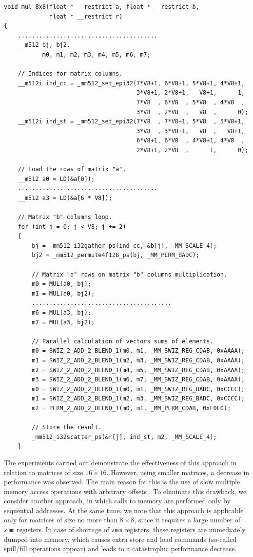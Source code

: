\documentclass[
11pt,%
tightenlines,%
twoside,%
onecolumn,%
nofloats,%
nobibnotes,%
nofootinbib,%
superscriptaddress,%
noshowpacs,%
centertags]%
{revtex4}
\begin{document}
\begin{lstlisting}[caption={Direct approach to \texttt{mul\_8x8} implementation.},label={lst:mul1}]
void mul_8x8(float * __restrict a, float * __restrict b,
             float * __restrict r)
{
    ........................................
    __m512 bj, bj2,
           m0, m1, m2, m3, m4, m5, m6, m7;

    // Indices for matrix columns.
    __m512i ind_cc = _mm512_set_epi32(7*V8+1, 6*V8+1, 5*V8+1, 4*V8+1,
                                      3*V8+1, 2*V8+1,   V8+1,      1,
                                      7*V8  , 6*V8  , 5*V8  , 4*V8  ,
                                      3*V8  , 2*V8  ,   V8  ,      0);
    __m512i ind_st = _mm512_set_epi32(7*V8  , 7*V8+1, 5*V8  , 5*V8+1,
                                      3*V8  , 3*V8+1,   V8  ,   V8+1,
                                      6*V8+1, 6*V8  , 4*V8+1, 4*V8  ,
                                      2*V8+1, 2*V8  ,      1,      0);

    // Load the rows of matrix "a".
    __m512 a0 = LD(&a[0]);
    ........................................
    __m512 a3 = LD(&a[6 * V8]);

    // Matrix "b" columns loop.
    for (int j = 0; j < V8; j += 2)
    {
        bj = _mm512_i32gather_ps(ind_cc, &b[j], _MM_SCALE_4);
        bj2 = _mm512_permute4f128_ps(bj, _MM_PERM_BADC);

        // Matrix "a" rows on matrix "b" columns multiplication.
        m0 = MUL(a0, bj);
        m1 = MUL(a0, bj2);
        ........................................
        m6 = MUL(a3, bj);
        m7 = MUL(a3, bj2);

        // Parallel calculation of vectors sums of elements.
        m0 = SWIZ_2_ADD_2_BLEND_1(m0, m1, _MM_SWIZ_REG_CDAB, 0xAAAA);
        m1 = SWIZ_2_ADD_2_BLEND_1(m2, m3, _MM_SWIZ_REG_CDAB, 0xAAAA);
        m2 = SWIZ_2_ADD_2_BLEND_1(m4, m5, _MM_SWIZ_REG_CDAB, 0xAAAA);
        m3 = SWIZ_2_ADD_2_BLEND_1(m6, m7, _MM_SWIZ_REG_CDAB, 0xAAAA);
        m0 = SWIZ_2_ADD_2_BLEND_1(m0, m1, _MM_SWIZ_REG_BADC, 0xCCCC);
        m1 = SWIZ_2_ADD_2_BLEND_1(m2, m3, _MM_SWIZ_REG_BADC, 0xCCCC);
        m2 = PERM_2_ADD_2_BLEND_1(m0, m1, _MM_PERM_CDAB, 0xF0F0);

        // Store the result.
        _mm512_i32scatter_ps(&r[j], ind_st, m2, _MM_SCALE_4);
    }
\end{lstlisting}

The experiments carried out demonstrate the effectiveness of this approach in relation to matrices of size $16 \times 16$.
However, using smaller matrices, a decrease in performance was observed.
The main reason for this is the use of slow multiple memory access operations with arbitrary offsets \cite{Aleen}.
To eliminate this drawback, we consider another approach, in which calls to memory are performed only by sequential addresses.
At the same time, we note that this approach is applicable only for matrices of size no more than $8 \times 8$, since it requires a large number of \texttt{zmm} registers.
In case of shortage of \texttt{zmm} registers, these registers are immediately dumped into memory, which causes extra store and load commands (so-called spill/fill operations appear) and leads to a catastrophic performance decrease.
\end{document}
